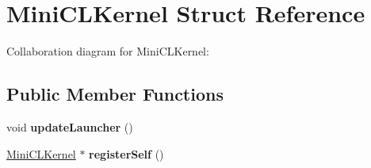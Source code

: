 \hypertarget{struct_mini_c_l_kernel}{\section{Mini\+C\+L\+Kernel Struct Reference}
\label{struct_mini_c_l_kernel}
}


Collaboration diagram for Mini\+C\+L\+Kernel\+:
\subsection*{Public Member Functions}
\begin{DoxyCompactItemize}
\item 
\hypertarget{struct_mini_c_l_kernel_aa16abd017bf098ce92951a4a2f88c006}{void {\bfseries update\+Launcher} ()}\label{struct_mini_c_l_kernel_aa16abd017bf098ce92951a4a2f88c006}

\item 
\hypertarget{struct_mini_c_l_kernel_a4c4943fbd7971911f1c207bdf0079da8}{\hyperlink{struct_mini_c_l_kernel}{Mini\+C\+L\+Kernel} $\ast$ {\bfseries register\+Self} ()}\label{struct_mini_c_l_kernel_a4c4943fbd7971911f1c207bdf0079da8}

\end{DoxyCompactItemize}
